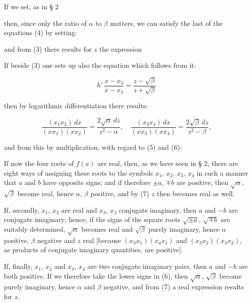 
If we set, as in § 2


then, since only the ratio of $\alpha$ to $\beta$ matters, we can satisfy the last of the equations (4) by setting: %


and from (3) there results for $z$ the expression


If beside (3) one sets up also the equation which follows from it:

\[
h'\,\dfrac{x-x_3}{x-x_4} = \dfrac{z-\sqrt{\beta}}{z+\sqrt{\beta}}
\]

then by logarithmic differentiation there results:

\[
\dfrac{(x_1x_2)\,dx}{(xx_1)(xx_2)} = \dfrac{2\sqrt{\alpha}\,dz}{z^2-\alpha}, \quad \dfrac{(x_3x_4)\,dx}{(xx_3)(xx_4)} = \dfrac{2\sqrt{\beta}\,dz}{z^2-\beta},
\]

and from this by multiplication, with regard to (5) and (6):


If now the four roots of $f(x)$ are real, then, as we have seen in § 2, there are eight ways of assigning these roots to the symbols $x_1$, $x_2$, $x_3$, $x_4$ in such a manner that $a$ and $b$ have opposite signs; and if therefore $\pm a$, $\mp b$ are positive, then $\sqrt{\alpha}$, $\sqrt{\beta}$ become real, hence $\alpha$, $\beta$ positive, and by (7) $z$ then becomes real as well.

If, secondly, $x_1$, $x_2$ are real and $x_3$, $x_4$ conjugate imaginary, then $a$ and $-b$ are conjugate imaginary; hence, if the signs of the square roots $\sqrt{\pm a}$, $\sqrt{\mp b}$ are suitably determined, $\sqrt{\alpha}$ becomes real and $\sqrt{\beta}$ purely imaginary, hence $\alpha$ positive, $\beta$ negative and $z$ real [because $(x_3x_1)(x_4x_1)$ and $(x_3x_2)(x_4x_2)$, as products of conjugate imaginary quantities, are positive].

If, finally, $x_1$, $x_2$ and $x_3$, $x_4$ are two conjugate imaginary pairs, then $a$ and $-b$ are both positive. If we therefore take the lower signs in (6), then $\sqrt{\alpha}$, $\sqrt{\beta}$ become purely imaginary, hence $\alpha$ and $\beta$ negative, and from (7) a real expression results for $z$.
